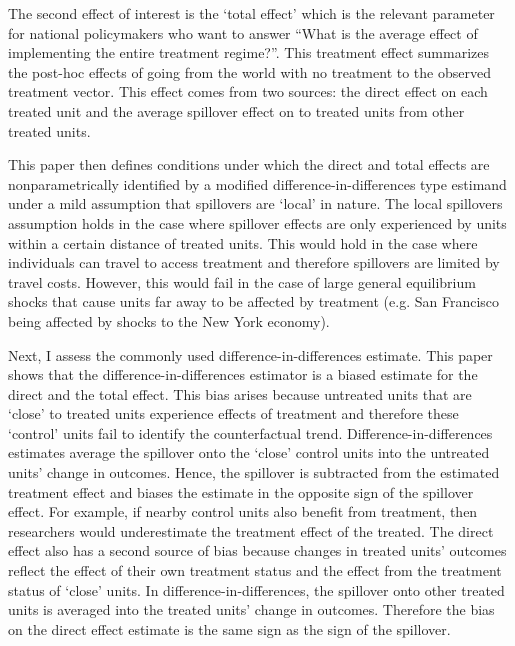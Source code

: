 \documentclass[11pt]{article}
\begin{document}
The second effect of interest is the `total effect' which is the relevant parameter for national policymakers who want to answer ``What is the average effect of implementing the entire treatment regime?''. This treatment effect summarizes the post-hoc effects of going from the world with no treatment to the observed treatment vector. This effect comes from two sources: the direct effect on each treated unit and the average spillover effect on to treated units from other treated units. 

This paper then defines conditions under which the direct and total effects are nonparametrically identified by a modified difference-in-differences type estimand under a mild assumption that spillovers are `local' in nature. The local spillovers assumption holds in the case where spillover effects are only experienced by units within a certain distance of treated units. This would hold in the case where individuals can travel to access treatment and therefore spillovers are limited by travel costs. However, this would fail in the case of large general equilibrium shocks that cause units far away to be affected by treatment (e.g. San Francisco being affected by shocks to the New York economy).

Next, I assess the commonly used difference-in-differences estimate. This paper shows that the difference-in-differences estimator is a biased estimate for the direct and the total effect. This bias arises because untreated units that are `close' to treated units experience effects of treatment and therefore these `control' units fail to identify the counterfactual trend. Difference-in-differences estimates average the spillover onto the `close' control units into the untreated units' change in outcomes. Hence, the spillover is subtracted from the estimated treatment effect and biases the estimate in the opposite sign of the spillover effect. For example, if nearby control units also benefit from treatment, then researchers would underestimate the treatment effect of the treated. The direct effect also has a second source of bias because changes in treated units' outcomes reflect the effect of their own treatment status and the effect from the treatment status of `close' units. In difference-in-differences, the spillover onto other treated units is averaged into the treated units' change in outcomes. Therefore the bias on the direct effect estimate is the same sign as the sign of the spillover. 
\end{document}
